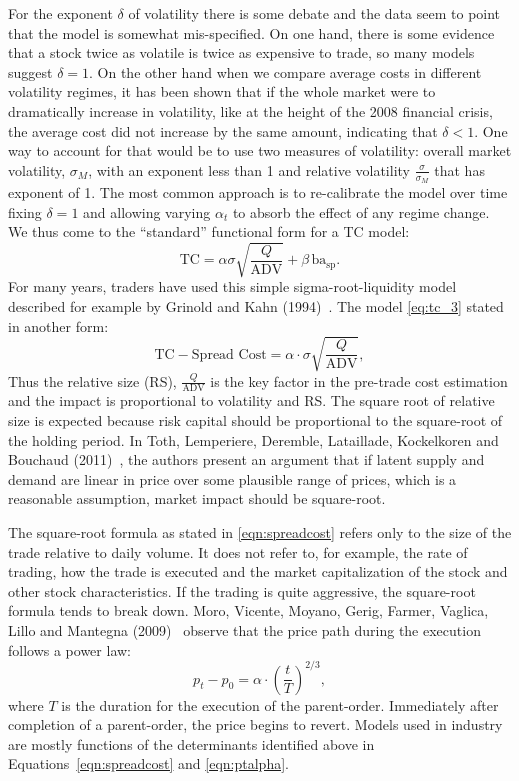 For the exponent $\delta$ of volatility there is some debate and the data seem to point that the model is somewhat mis-specified. On one hand, there is some evidence that a stock twice as volatile is twice as expensive to trade, so many models suggest $\delta = 1$. On the other hand when we compare average costs in different volatility regimes, it has been shown that if the whole market were to dramatically increase in volatility, like at the height of the 2008 financial crisis, the average cost did not increase by the same amount, indicating that $\delta < 1$. One way to account for that would be to use two measures of volatility: overall market volatility, $\sigma_M$, with an exponent less than 1 and relative volatility $\frac{\sigma}{\sigma_M}$ that has exponent of 1. The most common approach is to re-calibrate the model over time fixing $\delta=1$ and allowing varying $\alpha_t$ to absorb the effect of any regime change. We thus come to the ``standard'' functional form for a TC model:\label{in:sqmodel}
        \begin{equation}\label{eq:tc_3adv}
	\text{TC}= \alpha  \sigma \sqrt{\frac{Q}{\text{ADV}}} +  \beta\, \text{ba}_{\text{sp}}.
        \end{equation}
For many years, traders have used this simple sigma-root-liquidity model described for example by Grinold and Kahn (1994)~\cite{grin2000}. The model \eqref{eq:tc_3} stated in another form:
	\begin{equation} \label{eqn:spreadcost}
	\text{TC} - \text{Spread Cost} = \alpha \cdot \sigma \sqrt{\dfrac{Q}{\text{ADV}}},
	\end{equation}
Thus the relative size (RS), $\frac{Q}{\text{ADV}}$ is the key factor in the pre-trade cost estimation and the impact is proportional to volatility and RS. The square root of relative size is expected because risk capital should be proportional to the square-root of the holding period. In Toth, Lemperiere, Deremble, Lataillade, Kockelkoren and Bouchaud (2011)~\cite{toth2011anomalous}, the authors present an argument that if latent supply and demand are linear in price over some plausible range of prices, which is a reasonable assumption, market impact should be square-root.


The square-root formula as stated in \eqref{eqn:spreadcost} refers only to the size of the trade relative to daily volume. It does not refer to, for example, the rate of trading, how the trade is executed and the market capitalization of the stock and other stock characteristics. If the trading is quite aggressive, the square-root formula tends to break down. Moro, Vicente, Moyano, Gerig, Farmer, Vaglica, Lillo and Mantegna (2009)~\cite{moro2009market} observe that the price path during the execution follows a power law:
	\begin{equation} \label{eqn:ptalpha}
	p_t - p_0 = \alpha \cdot \left( {\frac{t}{T}} \right)^{2/3},
	\end{equation}
where $T$ is the duration for the execution of the parent-order. Immediately after completion of a parent-order, the price begins to revert. Models used in industry are mostly functions of the determinants identified above in Equations~\eqref{eqn:spreadcost} and \eqref{eqn:ptalpha}.


